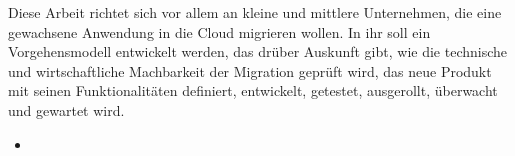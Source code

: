Diese Arbeit richtet sich vor allem an kleine und mittlere Unternehmen, die 
eine gewachsene Anwendung in die Cloud migrieren wollen. In ihr soll ein 
Vorgehensmodell entwickelt werden, das drüber Auskunft gibt, wie die technische 
und wirtschaftliche Machbarkeit der Migration geprüft wird, das neue Produkt 
mit seinen Funktionalitäten definiert, entwickelt, getestet, ausgerollt, 
überwacht und gewartet wird.
\begin{itemize}
	\item 
\end{itemize}


\begin{comment}
Reply, das Unternehmen mit dem in Kooperation diese 
Bachelor-Thesis 
entstanden ist, ist ein an der italienischen Börse gehandeltes 
IT-Beratungsunternehmen und betrachtet sich 
als "`Living network"'\ aus hochspezialisierten Tochterunternehmen. Seit der 
Gründung 1996 konnte Reply seinen Umsatz auf über 705 Millionen Euro bei 5.245 
Angestellten im Jahr 2015 steigern. Das Netzwerk wuchs und wächst rasch: 
2016 wurden bis November drei neue Firmen aquiriert. Zwei 
Tochtergesellschaften, die schon seit mehreren Jahren Teil von Reply sind, 
möchte ich genauer vorstellen, da ihre Unternehmensprofile das 
Migrationsprojekt in dessen Rahmen diese Thesis entstanden ist, in besonderem 
Maße beeinflussen. \\
Die vormalige syskoplan AG, seit dem Erwerb 2010 \pcite{}{12}{replycompprofile} 
Syskoplan Reply, ist ein Spezialist für SAP-Applikationen und 
-Plattformen \pcite{}{10}{replycompprofile} und entwickelt seit 1999 das 
integrierte Facility Management System (iFMS). iFMS verbindet die in SAP 
hinterlegten Daten mit Gebäudeplänen und versucht Prozesse rund um die 
Verwaltung von Immobilien zu unterstützen. Die gewachsene 
Java-Anwendung mit einer Client-Server-Architektur lässt sich inzwischen nur 
noch schwer um von Kunden gewünschte Funktionen erweitern. Auch die Bedienung 
über 
eine zusätzlich zu installierenden Anwendung wirkt in Zeiten, in denen Nutzer 
es gewohnt sind, auch umfangreiche Software über den Webbrowser zu bedienen, 
anachronstisch. Beide Aspekte schränken die zukünftige
Wettbewerbsfähigkeit der Software ein. \\
Die ehemalige Arlanis Software AG wurde 2012 von Reply übernommen und ist 
Spezialist für Lösungen auf Basis des Cloud Anbieters Salesforce. 


\end{comment}
